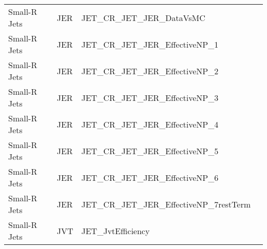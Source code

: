 \begin{table}[!hp]
\begin{center}
\begin{tabular}{|l|l|l|l|}
        Small-R Jets  & JER                  &  JET\_CR\_JET\_JER\_DataVsMC                  & \\ 
        Small-R Jets  & JER                  &  JET\_CR\_JET\_JER\_EffectiveNP\_1            & \\ 
        Small-R Jets  & JER                  &  JET\_CR\_JET\_JER\_EffectiveNP\_2            & \\ 
        Small-R Jets  & JER                  &  JET\_CR\_JET\_JER\_EffectiveNP\_3            & \\ 
        Small-R Jets  & JER                  &  JET\_CR\_JET\_JER\_EffectiveNP\_4            & \\ 
        Small-R Jets  & JER                  &  JET\_CR\_JET\_JER\_EffectiveNP\_5            & \\ 
        Small-R Jets  & JER                  &  JET\_CR\_JET\_JER\_EffectiveNP\_6            & \\ 
        Small-R Jets  & JER                  &  JET\_CR\_JET\_JER\_EffectiveNP\_7restTerm    & \\ 
        \hline
        Small-R Jets  & JVT                  &  JET\_JvtEfficiency    & \\
        \hline
        \end{tabular}
    \end{center}
  \end{table}


